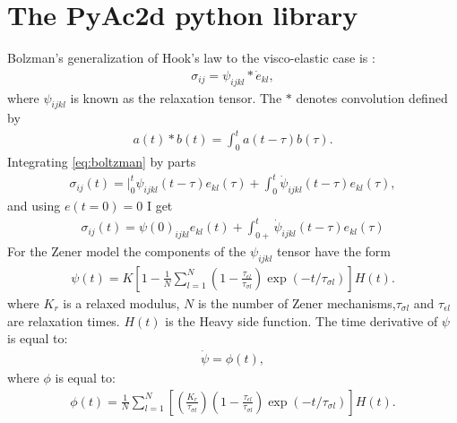 \documentclass[11pt]{article}
\begin{document}
\section{The PyAc2d python library} 
Bolzman's generalization of Hook's law to the visco-elastic case is
\citep{Hudson1985}:
\begin{eqnarray}
\sigma_{ij} = \psi_{ijkl}*\dot{e}_{kl},
                  \label{eq:boltzman}
\end{eqnarray}where $\psi_{ijkl}$ is known as the relaxation tensor.
The $*$ denotes convolution defined by
\begin{eqnarray}
a(t)*b(t)=\int_0^t a(t-\tau)b(\tau).
\end{eqnarray}
Integrating \eqref{eq:boltzman} by parts
\begin{eqnarray}
\sigma_{ij}(t)=|_0^t \psi_{ijkl}(t-\tau)e_{kl}(\tau) +\int_0^t \dot{\psi}_{ijkl}(t-\tau)e_{kl}(\tau),
\end{eqnarray}
and using $e(t=0)=0$ I get
\begin{eqnarray}
\sigma_{ij}(t)=\psi(0)_{ijkl}e_{kl}(t) +\int_{0+}^t \dot{\psi}_{ijkl}(t-\tau)e_{kl}(\tau)
\end{eqnarray}
For the Zener model the components of the $\psi_{ijkl}$ tensor have the form
\begin{eqnarray}
  \psi(t)=K\left[1-\frac{1}{N}\sum_{l=1}^N 
            (1-\frac{\tau_{\epsilon l}}{\tau_{\sigma l}})\exp(-t/\tau_{\sigma l})\right]H(t).
\end{eqnarray}
%
where $K_r$ is a relaxed modulus, $N$ is the number of Zener mechanisms,$\tau_{\sigma l}$
and $\tau_{\epsilon l}$ are relaxation times. $H(t)$ is the Heavy side function.
The time derivative of $\psi$ is equal to:
\begin{eqnarray}
\dot{\psi} = \phi(t),
\end{eqnarray}
where $\phi$ is equal to:
\begin{eqnarray}
\phi(t)=
  \frac{1}{N}\sum_{l=1}^N\left[\left(\frac{K_r}{\tau_{\sigma l}}\right) 
            \left(1-\frac{\tau_{\epsilon l}}{\tau_{\sigma l}}\right)\exp(-t/\tau_{\sigma l})\right]H(t).
                \label{eq:phi}
\end{eqnarray}
\end{document}
